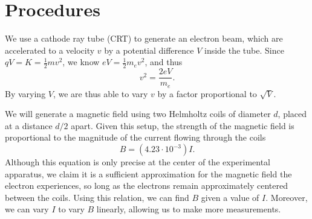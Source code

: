 \documentclass[11pt, letterpaper]{report}
\begin{document}
\section{Procedures}
We use a cathode ray tube (CRT) to generate an electron beam, which are accelerated to a velocity $v$ by a potential difference $V$ inside the tube. Since $qV=K=\frac{1}{2}mv^2$, we know $eV=\frac{1}{2}m_ev^2$, and thus
\begin{equation}\label{eq:7}
	v^2 = \frac{2eV}{m_e}
.\end{equation}
By varying $V$, we are thus able to vary $v$ by a factor proportional to $\sqrt{V} $.

We will generate a magnetic field using two Helmholtz coils of diameter $d$, placed at a distance $d / 2$ apart. Given this setup, the strength of the magnetic field is proportional to the magnitude of the current flowing through the coils
 \begin{equation}\label{eq:8}
	 B=\left( 4.23\cdot 10^{-3} \right) I
.\end{equation}
Although this equation is only precise at the center of the experimental apparatus, we claim it is a sufficient approximation for the magnetic field the electron experiences, so long as the electrons remain approximately centered between the coils. Using this relation, we can find $B$ given a value of $I$. Moreover, we can vary  $I$ to vary $B$ linearly, allowing us to make more measurements.
\end{document}
